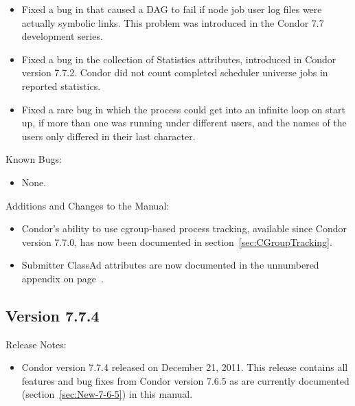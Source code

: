 \begin{itemize}
\item Fixed a bug in  that caused a DAG to fail if node
job user log files were actually symbolic links.  
This problem was introduced in the Condor 7.7 development series.

\item Fixed a bug in the collection of Statistics attributes,
introduced in Condor version 7.7.2.
Condor did not count completed scheduler universe jobs in reported statistics.

\item Fixed a rare bug in which the  process could get
into an infinite loop on start up,
if more than one  was running under different users,
and the names of the users only differed in their last character.

\end{itemize}

\noindent Known Bugs:

\begin{itemize}

\item None.

\end{itemize}

\noindent Additions and Changes to the Manual:

\begin{itemize}

\item Condor's ability to use cgroup-based process tracking,
available since Condor version 7.7.0,
has now been documented in section~\ref{sec:CGroupTracking}.

\item Submitter ClassAd attributes are now documented in the unnumbered
appendix on page~\pageref{sec:Submitter-ClassAd-Attributes}.

\end{itemize}


\subsection*{\label{sec:New-7-7-4}Version 7.7.4}

\noindent Release Notes:

\begin{itemize}

\item Condor version 7.7.4 released on December 21, 2011.
This release contains all features and bug fixes from Condor version 7.6.5 
as are currently documented (section~\ref{sec:New-7-6-5}) in this manual. 

\end{itemize}


